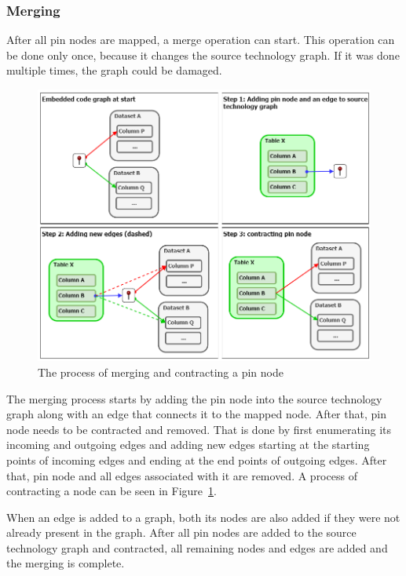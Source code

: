 \subsubsection{Merging}
After all pin nodes are mapped, a merge operation can start. This operation can be done only once, because it changes the source technology graph. If it was done multiple times, the graph could be damaged.
\begin{figure}[ht]\centering
\includegraphics[width=1.0\textwidth]{img/contraction.png}
\caption{The process of merging and contracting a pin node}
\label{fig:contraction}
\end{figure}   
\par
The merging process starts by adding the pin node into the source technology graph along with an edge that connects it to the mapped node. After that, pin node needs to be contracted and removed. That is done by first enumerating its incoming and outgoing edges and adding new edges starting at the starting points of incoming edges and ending at the end points of outgoing edges. After that, pin node and all edges associated with it are removed. A process of contracting a node can be seen in Figure~\ref{fig:contraction}.
\par
When an edge is added to a graph, both its nodes are also added if they were not already present in the graph. After all pin nodes are added to the source technology graph and contracted, all remaining nodes and edges are added and the merging is complete. 





